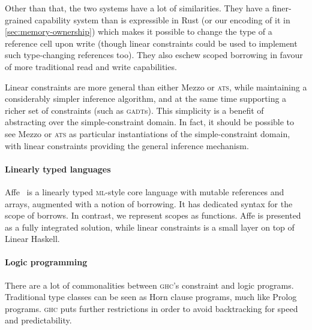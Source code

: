\documentclass[acmsmall,usenames,dvipsnames,natbib=false,acmthm=false,screen]{acmart}
\theoremstyle{acmplain}
\theoremstyle{acmdefinition}
\begin{document}
Other than that, the two systems have a lot of similarities. They have a
finer-grained capability system than is expressible in Rust (or our
encoding of it in \cref{sec:memory-ownership}) which makes it possible to change
the type of a reference cell upon write (though linear constraints could be used to implement such type-changing references too). They also eschew scoped
borrowing in favour of more traditional read and write capabilities.


Linear constraints are more general than either Mezzo or \textsc{ats},
while maintaining a considerably simpler inference algorithm, and at
the same time supporting a richer set of constraints (such as \textsc{gadt}s). This
simplicity is a benefit of abstracting over the simple-constraint
domain. In fact, it should be possible to see Mezzo or \textsc{ats} as
particular instantiations of the simple-constraint domain, with linear
constraints providing the general inference mechanism.


\paragraph{Linearly typed languages}

Affe~\cite{kindly-bent} is a linearly typed \textsc{ml}-style core
language with mutable references and arrays, augmented with a notion
of borrowing. It has dedicated syntax for the scope of borrows. In
contrast, we represent scopes as functions. Affe is presented as a
fully integrated solution, while linear constraints is a small layer
on top of Linear Haskell.

\paragraph{Logic programming}

There are a lot of commonalities between \textsc{ghc}'s constraint and logic
programs. Traditional type classes can be seen as Horn clause programs, much
like Prolog programs. \textsc{ghc} puts further restrictions in order to
avoid backtracking for speed and predictability.
\end{document}
